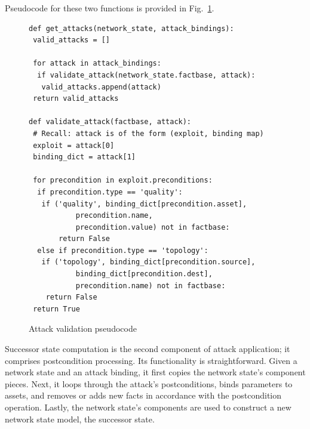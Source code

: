 Pseudocode for these two functions is provided in Fig.~\ref{fig:get_attacks_pc}.

\begin{figure}
\begin{lstlisting}
def get_attacks(network_state, attack_bindings):
 valid_attacks = []
 
 for attack in attack_bindings:
  if validate_attack(network_state.factbase, attack):
   valid_attacks.append(attack)
 return valid_attacks

def validate_attack(factbase, attack):
 # Recall: attack is of the form (exploit, binding map)
 exploit = attack[0]
 binding_dict = attack[1]
 
 for precondition in exploit.preconditions:
  if precondition.type == 'quality':
   if ('quality', binding_dict[precondition.asset], 
           precondition.name, 
           precondition.value) not in factbase:
       return False
  else if precondition.type == 'topology':
   if ('topology', binding_dict[precondition.source], 
           binding_dict[precondition.dest],
           precondition.name) not in factbase:
    return False
 return True
\end{lstlisting}
\caption{Attack validation pseudocode}
\label{fig:get_attacks_pc}
\end{figure}
Successor state computation is the second component of attack application;
it comprises postcondition processing. Its functionality is straightforward.
Given a network state and an attack binding, it first copies the network state's
component pieces. Next, it loops through the attack's
postconditions, binds parameters to assets, and removes or adds new facts
in accordance with the postcondition operation. Lastly, the network state's
components are used to construct a new network state model, the successor
state.


